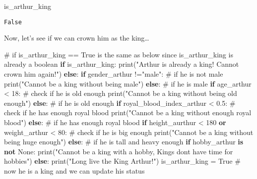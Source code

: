 \documentclass[
  letterpaper,
  DIV=11,
  numbers=noendperiod]{scrreprt}
\newenvironment{Shaded}{\begin{snugshade}}{\end{snugshade}}
\newcommand{\BuiltInTok}[1]{\textcolor[rgb]{0.00,0.23,0.31}{#1}}
\newcommand{\CommentTok}[1]{\textcolor[rgb]{0.37,0.37,0.37}{#1}}
\newcommand{\ControlFlowTok}[1]{\textcolor[rgb]{0.00,0.23,0.31}{\textbf{#1}}}
\newcommand{\DecValTok}[1]{\textcolor[rgb]{0.68,0.00,0.00}{#1}}
\newcommand{\FloatTok}[1]{\textcolor[rgb]{0.68,0.00,0.00}{#1}}
\newcommand{\KeywordTok}[1]{\textcolor[rgb]{0.00,0.23,0.31}{\textbf{#1}}}
\newcommand{\NormalTok}[1]{\textcolor[rgb]{0.00,0.23,0.31}{#1}}
\newcommand{\OperatorTok}[1]{\textcolor[rgb]{0.37,0.37,0.37}{#1}}
\newcommand{\StringTok}[1]{\textcolor[rgb]{0.13,0.47,0.30}{#1}}
\newcommand{\VariableTok}[1]{\textcolor[rgb]{0.07,0.07,0.07}{#1}}
\begin{document}
\begin{Shaded}
\begin{Highlighting}[]
\NormalTok{is\_arthur\_king}
\end{Highlighting}
\end{Shaded}

\begin{verbatim}
False
\end{verbatim}

Now, let's see if we can crown him as the king\ldots{}

\begin{Shaded}
\begin{Highlighting}[]
\CommentTok{\# if is\_arthur\_king == True is the same as below since is\_arthur\_king is already a boolean}
\ControlFlowTok{if}\NormalTok{ is\_arthur\_king: }
    \BuiltInTok{print}\NormalTok{(}\StringTok{"Arthur is already a king! Cannot crown him again!"}\NormalTok{)}
\ControlFlowTok{else}\NormalTok{:}
    \ControlFlowTok{if}\NormalTok{ gender\_arthur }\OperatorTok{!=}\StringTok{"male"}\NormalTok{: }\CommentTok{\# if he is not male}
        \BuiltInTok{print}\NormalTok{(}\StringTok{"Cannot be a king without being male"}\NormalTok{)}
    \ControlFlowTok{else}\NormalTok{: }\CommentTok{\# if he is male}
        \ControlFlowTok{if}\NormalTok{ age\_arthur }\OperatorTok{\textless{}} \DecValTok{18}\NormalTok{: }\CommentTok{\# check if he is old enough}
            \BuiltInTok{print}\NormalTok{(}\StringTok{"Cannot be a king without being old enough"}\NormalTok{)}
        \ControlFlowTok{else}\NormalTok{: }\CommentTok{\# if he is old enough}
            \ControlFlowTok{if}\NormalTok{ royal\_blood\_index\_arthur }\OperatorTok{\textless{}} \FloatTok{0.5}\NormalTok{: }\CommentTok{\# check if he has enough royal blood}
                \BuiltInTok{print}\NormalTok{(}\StringTok{"Cannot be a king without enough royal blood"}\NormalTok{)}
            \ControlFlowTok{else}\NormalTok{: }\CommentTok{\# if he has enough royal blood}
                \ControlFlowTok{if}\NormalTok{ height\_aurthur }\OperatorTok{\textless{}} \DecValTok{180} \KeywordTok{or}\NormalTok{ weight\_arthur }\OperatorTok{\textless{}} \DecValTok{80}\NormalTok{: }\CommentTok{\# check if he is big enough}
                    \BuiltInTok{print}\NormalTok{(}\StringTok{"Cannot be a king without being huge enough"}\NormalTok{)}
                \ControlFlowTok{else}\NormalTok{: }\CommentTok{\# if he is tall and heavy enough}
                    \ControlFlowTok{if}\NormalTok{ hobby\_arthur }\KeywordTok{is} \KeywordTok{not} \VariableTok{None}\NormalTok{:}
                        \BuiltInTok{print}\NormalTok{(}\StringTok{"Cannot be a king with a hobby, Kings don\textquotesingle{}t have time for hobbies"}\NormalTok{)}
                    \ControlFlowTok{else}\NormalTok{:}
                        \BuiltInTok{print}\NormalTok{(}\StringTok{"Long live the King Arthur!"}\NormalTok{)}
\NormalTok{                        is\_arthur\_king }\OperatorTok{=} \VariableTok{True} \CommentTok{\# now he is a king and we can update his status}

                
\end{Highlighting}
\end{Shaded}
\end{document}
